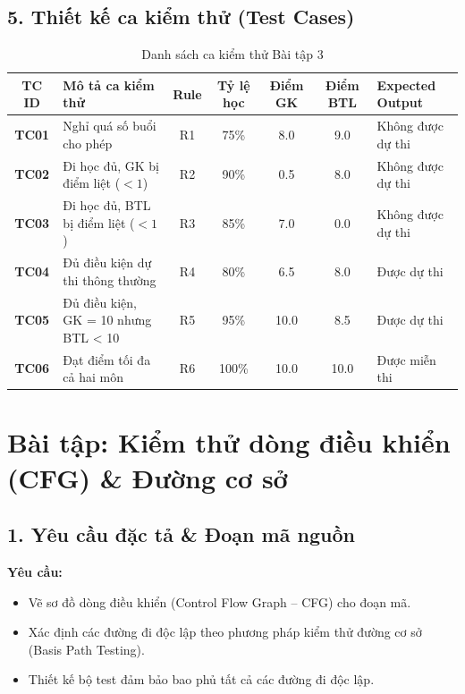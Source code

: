 \documentclass[11pt,a4paper]{article}
\begin{document}
\subsection*{5. Thiết kế ca kiểm thử (Test Cases)}

\begin{table}[H]
\centering
\renewcommand{\arraystretch}{1.2}
\begin{tabularx}{\textwidth}{|c|L|c|c|c|c|L|}
\hline
{}
\textbf{TC ID} & \textbf{Mô tả ca kiểm thử} & \textbf{Rule} & \textbf{Tỷ lệ học} & \textbf{Điểm GK} & \textbf{Điểm BTL} & \textbf{Expected Output} \\ \hline
\textbf{TC01} & Nghỉ quá số buổi cho phép & R1 & 75\% & 8.0 & 9.0 & Không được dự thi \\ \hline
\textbf{TC02} & Đi học đủ, GK bị điểm liệt ($< 1$) & R2 & 90\% & 0.5 & 8.0 & Không được dự thi \\ \hline
\textbf{TC03} & Đi học đủ, BTL bị điểm liệt ($< 1$) & R3 & 85\% & 7.0 & 0.0 & Không được dự thi \\ \hline
\textbf{TC04} & Đủ điều kiện dự thi thông thường & R4 & 80\% & 6.5 & 8.0 & Được dự thi \\ \hline
\textbf{TC05} & Đủ điều kiện, GK = 10 nhưng BTL < 10 & R5 & 95\% & 10.0 & 8.5 & Được dự thi \\ \hline
\textbf{TC06} & Đạt điểm tối đa cả hai môn & R6 & 100\% & 10.0 & 10.0 & Được miễn thi \\ \hline
\end{tabularx}
\caption*{Danh sách ca kiểm thử Bài tập 3}
\end{table}

\newpage

\section*{Bài tập: Kiểm thử dòng điều khiển (CFG) \& Đường cơ sở}

\subsection*{1. Yêu cầu đặc tả \& Đoạn mã nguồn}
\noindent\textbf{Yêu cầu:}
\begin{itemize}[noitemsep]
    \item Vẽ sơ đồ dòng điều khiển (Control Flow Graph -- CFG) cho đoạn mã.
    \item Xác định các đường đi độc lập theo phương pháp kiểm thử đường cơ sở (Basis Path Testing).
    \item Thiết kế bộ test đảm bảo bao phủ tất cả các đường đi độc lập.
\end{itemize}
\end{document}
